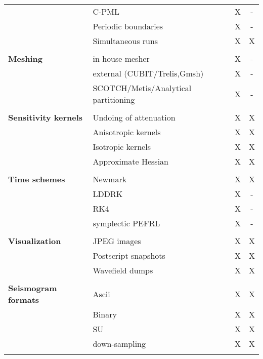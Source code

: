 \begin{table}[htp]
\begin{center}
\begin{tabular}{ l l c c}
                        & C-PML                             & X  & - \\
                        & Periodic boundaries               & X  & - \\
                        & Simultaneous runs                 & X  & X \\
\hline
& & & \\
{\bf Meshing}           & in-house mesher                       & X  & - \\
                        & external (CUBIT/Trelis,Gmsh)          & X  & - \\
                        & SCOTCH/Metis/Analytical partitioning  & X  & - \\
\hline
& & & \\
{\bf Sensitivity kernels} & Undoing of attenuation          & X  & X \\
                          & Anisotropic kernels             & X  & X \\
                          & Isotropic kernels               & X  & X \\
                          & Approximate Hessian             & X  & X \\
\hline
& & & \\
{\bf Time schemes}  & Newmark           & X  & X \\
                    & LDDRK             & X  & - \\
                    & RK4               & X  & - \\
                    & symplectic PEFRL  & X  & - \\
\hline
& & & \\
{\bf Visualization} & JPEG images          & X  & X \\
                    & Postscript snapshots & X  & X \\
                    & Wavefield dumps      & X  & X \\
\hline
& & & \\
{\bf Seismogram formats}  & Ascii          & X  & X \\
                          & Binary         & X  & X \\
                          & SU             & X  & X \\
                          & down-sampling  & X  & X \\
%
\hline
& & & \\ %
\end{tabular}
\end{center}
\end{table}


